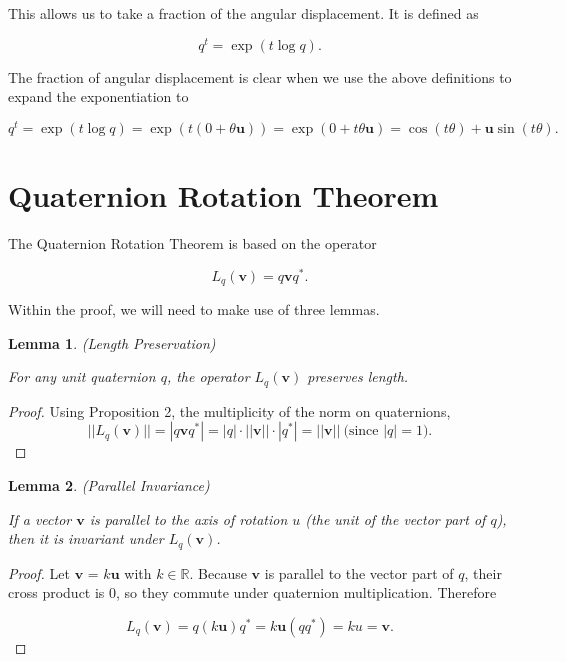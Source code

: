 \documentclass[a4paper, 11pt]{article}
\newtheorem{lemma}{Lemma}
\begin{document}
This allows us to take a fraction of the angular displacement. It is defined as

\[q^t = \exp(t \log  q).\]  \citep[p.~171]{dunn_parberry_2002}

The fraction of angular displacement is clear when we use the above definitions to expand the exponentiation to

\[q^t = \exp(t \log  q) = \exp(t (0+\theta\boldsymbol{u})) = \exp(0+t\theta\boldsymbol{u}) = \cos (t\theta) + \boldsymbol{u}\sin (t\theta).\] 

\section{Quaternion Rotation Theorem}

The Quaternion Rotation Theorem is based on the operator

\[L_q(\boldsymbol{v}) = q\boldsymbol{v}q^*.\]

Within the proof, we will need to make use of three lemmas. 

\begin{lemma}(Length Preservation)

    For any unit quaternion $q$, the operator \(L_q(\boldsymbol{v})\) preserves length.
\end{lemma}

\begin{proof} Using Proposition 2, the multiplicity of the norm on quaternions, 
    \[
        ||L_q(\boldsymbol{v})|| = |q\boldsymbol{v}q^*|
    = |q| \cdot ||\boldsymbol{v}|| \cdot |q^*| = ||\boldsymbol{v}|| \ \text{(since $|q| = 1$)}.\]
\end{proof}

\begin{lemma}(Parallel Invariance)

    If a vector $\boldsymbol{v}$ is parallel to the axis of rotation $u$ (the unit of the vector part of $q$), then it is invariant under $L_q(\boldsymbol{v})$.
\end{lemma}

\begin{proof}
    Let $\boldsymbol{v}$ = $k\boldsymbol{u}$ with $k \in \mathbb{R}$. Because $\boldsymbol{v}$ is parallel to the vector part of $q$, their cross product is $0$, so they commute under quaternion multiplication. Therefore

    \[L_q(\boldsymbol{v}) = q(k\boldsymbol{u})q^* = k\boldsymbol{u}(qq^*) = ku = \boldsymbol{v}.\]
\end{proof}
\end{document}
